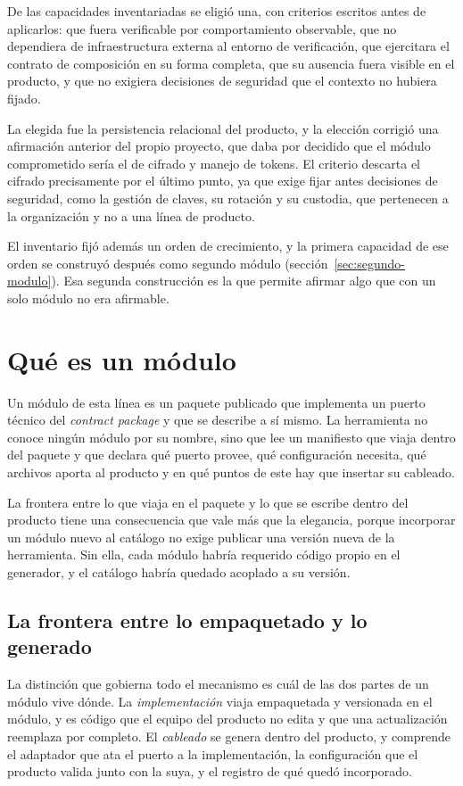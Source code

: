 De las capacidades inventariadas se eligió una, con criterios escritos antes
de aplicarlos: que fuera verificable por comportamiento observable, que no
dependiera de infraestructura externa al entorno de verificación, que
ejercitara el contrato de composición en su forma completa, que su ausencia
fuera visible en el producto, y que no exigiera decisiones de seguridad que
el contexto no hubiera fijado.

La elegida fue la persistencia relacional del producto, y la
elección corrigió una afirmación anterior del propio proyecto, que daba por
decidido que el módulo comprometido sería el de cifrado y manejo de tokens.
El criterio descarta el cifrado precisamente por el último punto, ya que
exige fijar antes decisiones de seguridad, como la gestión de claves, su
rotación y su custodia, que pertenecen a la organización y no a una línea de
producto.

El inventario fijó además un orden de crecimiento, y la primera capacidad de
ese orden se construyó después como segundo módulo
(sección~\ref{sec:segundo-modulo}). Esa segunda construcción es la que
permite afirmar algo que con un solo módulo no era afirmable.

\section{Qué es un módulo}
\label{sec:anatomia-modulo}

Un módulo de esta línea es un paquete publicado que implementa un puerto
técnico del \emph{contract package} y que se describe a sí mismo. La
herramienta no conoce ningún módulo por su nombre, sino que lee un manifiesto
que viaja dentro del paquete y que declara qué puerto provee, qué
configuración necesita, qué archivos aporta al producto y en qué puntos de
este hay que insertar su cableado.

La frontera entre lo que viaja en el paquete y lo que se escribe dentro del
producto tiene una consecuencia que vale más que la elegancia, porque
incorporar un módulo nuevo al catálogo no exige publicar una versión nueva de
la herramienta. Sin ella, cada módulo habría requerido código propio en el
generador, y el catálogo habría quedado acoplado a su versión.

\subsection{La frontera entre lo empaquetado y lo generado}

La distinción que gobierna todo el mecanismo es cuál de las dos partes de un
módulo vive dónde. La \emph{implementación} viaja empaquetada y versionada en
el módulo, y es código que el equipo del producto no edita y que una
actualización reemplaza por completo. El \emph{cableado} se genera dentro del
producto, y comprende el adaptador que ata el puerto a la implementación, la
configuración que el producto valida junto con la suya, y el registro de qué
quedó incorporado.

